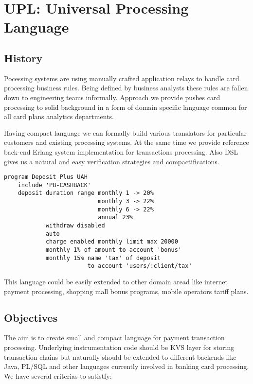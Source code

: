 \section{UPL: Universal Processing Language}

\subsection{History}

Pocessing systems are using manually crafted application
relays to handle card processing business rules. Being defined by business
analysts these rules are fallen down to engineering teams informally.
Approach we provide pushes card processing to solid background in a form
of domain specific language common for all card plans analytics departments.

Having compact language we can formally build various translators
for particular customers and existing processing systems. At the same time
we provide reference back-end Erlang system implementation
for transactions processing. Also DSL gives us a natural and easy
verification strategies and compactifications.

\vspace{1\baselineskip}
\begin{lstlisting}[caption=Deposit Program]
    program Deposit_Plus UAH
    include 'PB-CASHBACK'
    deposit duration range monthly 1 -> 20%
                           monthly 3 -> 22%
                           monthly 6 -> 22%
                           annual 23%
            withdraw disabled
            auto
            charge enabled monthly limit max 20000
            monthly 1% of amount to account 'bonus'
            monthly 15% name 'tax' of deposit 
                        to account 'users/:client/tax'
\end{lstlisting}
\vspace{1\baselineskip}

This language could be easily extended to other domain aread like
internet payment processing, shopping mall bonus programs, mobile
operators tariff plans.

\newpage
\subsection{Objectives}

The aim is to create small and compact language for payment
transaction processing. Underlying instrumentation
code should be KVS layer for storing transaction chains but
naturally should be extended to different backends like Java,
PL/SQL and other languages currently involved in banking card processing.
We have several criterias to satistfy:

